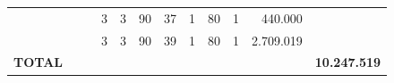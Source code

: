 \documentclass{article}
\begin{document}
\begin{longtable}[c]{m{6.5cm}|m{1pt}m{1pt}m{1pt}m{1pt}m{1pt}m{1pt}|m{1pt}m{1pt}m{0.5pt}m{1pt}|m{1pt}|m{1pt}m{1pt}|m{1pt}|m{2pt}}
& & & & & & & \multicolumn{1}{c}{ 3 } & \multicolumn{1}{c}{ 3 } & \multicolumn{1}{c}{ 90 } & \multicolumn{1}{c|}{ 37 } & \multicolumn{1}{c|}{ 1 } & \multicolumn{1}{l}{ 80 } & \multicolumn{1}{c|}{ 1 } & \multicolumn{1}{r|}{ 440.000 } & \\
& & & & & & & \multicolumn{1}{c}{ 3 } & \multicolumn{1}{c}{ 3 } & \multicolumn{1}{c}{ 90 } & \multicolumn{1}{c|}{ 39 } & \multicolumn{1}{c|}{ 1 } & \multicolumn{1}{l}{ 80 } & \multicolumn{1}{c|}{ 1 } & \multicolumn{1}{r|}{ 2.709.019 } & \\
\hline
\multicolumn{15}{C{6cm}|}{\textbf{ TOTAL }} & \multicolumn{1}{r}{\textbf{ 10.247.519 }} \\
\end{longtable}
\newpage
{}
{}
\renewcommand*{\arraystretch}{1.9}
\scriptsize
\color{myblack}
\centering
\end{document}
